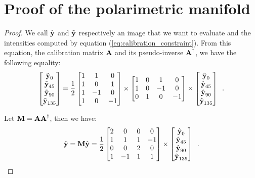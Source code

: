 \chapter{Proof of the polarimetric manifold}
\label{app:physical_prop}

\begin{proof}
	We call $\hat{\textbf{y}}$ and $\tilde{\textbf{y}}$ respectively an image that we want to evaluate and the intensities computed by equation (\ref{eq:calibration_constraint}). From this equation, the calibration matrix $\ma$ and its pseudo-inverse $\ma^\dagger$, we have the following equality:
	\begin{equation}
			\label{eq:app_problem}
		\begin{bmatrix} 
			\tilde{\textbf{y}}_0 \\
			\tilde{\textbf{y}}_{45} \\	
			\tilde{\textbf{y}}_{90} \\
			\tilde{\textbf{y}}_{135} 
		\end{bmatrix} = \frac{1}{2}\begin{bmatrix}
			1 & 1 & 0 \\
			1 & 0 & 1 \\
			1 & -1 & 0 \\
			1 & 0 & -1
		\end{bmatrix}
		\times \begin{bmatrix}
			1 & 0 & 1 & 0 \\
			1 & 0 & -1 & 0 \\
			0 & 1 & 0 & -1
		\end{bmatrix} \times \begin{bmatrix} 
			\hat{\textbf{y}}_0 \\
			\hat{\textbf{y}}_{45} \\
			\hat{\textbf{y}}_{90} \\
			\hat{\textbf{y}}_{135}
		\end{bmatrix}\enspace.
	\end{equation}
	
	Let $\mm = \ma\ma^\dagger$, then we have:
	$$
	\tilde{\vy} = \mm\hat{\vy} = \frac{1}{2}\begin{bmatrix}
		2 & 0 & 0 & 0 \\
		1 & 1 & 1 & -1 \\
		0 & 0 & 2 & 0 \\
		1 & -1 & 1 & 1
	\end{bmatrix} \times \begin{bmatrix} 
		\hat{\vy}_0 \\
		\hat{\vy}_{45} \\
		\hat{\vy}_{90} \\
		\hat{\vy}_{135}
	\end{bmatrix} \enspace.
	$$
	

\end{proof}
